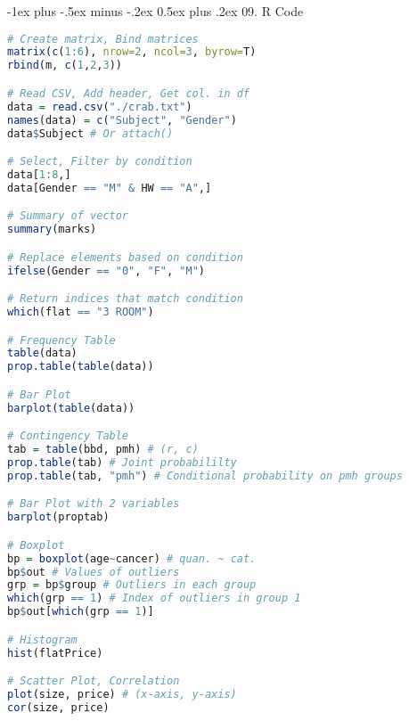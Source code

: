 \documentclass{article}
\makeatletter
\renewcommand{\section}{\@startsection{section}{1}{0mm}%
  {-1ex plus -.5ex minus -.2ex}%
  {0.5ex plus .2ex}%
{\normalfont\large\bfseries}}
\makeatother
\begin{document}
\begin{multicols}{4}
\section{09. R Code}

\begin{lstlisting}[language=R, breaklines=true]
# Create matrix, Bind matrices
matrix(c(1:6), nrow=2, ncol=3, byrow=T)
rbind(m, c(1,2,3))

# Read CSV, Add header, Get col. in df
data = read.csv("./crab.txt")
names(data) = c("Subject", "Gender")
data$Subject # Or attach()

# Select, Filter by condition
data[1:8,]
data[Gender == "M" & HW == "A",]

# Summary of vector
summary(marks)

# Replace elements based on condition
ifelse(Gender == "0", "F", "M")

# Return indices that match condition
which(flat == "3 ROOM")

# Frequency Table
table(data)
prop.table(table(data))

# Bar Plot
barplot(table(data))

# Contingency Table 
tab = table(bbd, pmh) # (r, c)
prop.table(tab) # Joint probabililty
prop.table(tab, "pmh") # Conditional probability on pmh groups

# Bar Plot with 2 variables
barplot(proptab)

# Boxplot
bp = boxplot(age~cancer) # quan. ~ cat.
bp$out # Values of outliers
grp = bp$group # Outliers in each group
which(grp == 1) # Index of outliers in group 1
bp$out[which(grp == 1)] 

# Histogram
hist(flatPrice)

# Scatter Plot, Correlation
plot(size, price) # (x-axis, y-axis)
cor(size, price)

\end{lstlisting}

\end{multicols}
\end{document}
